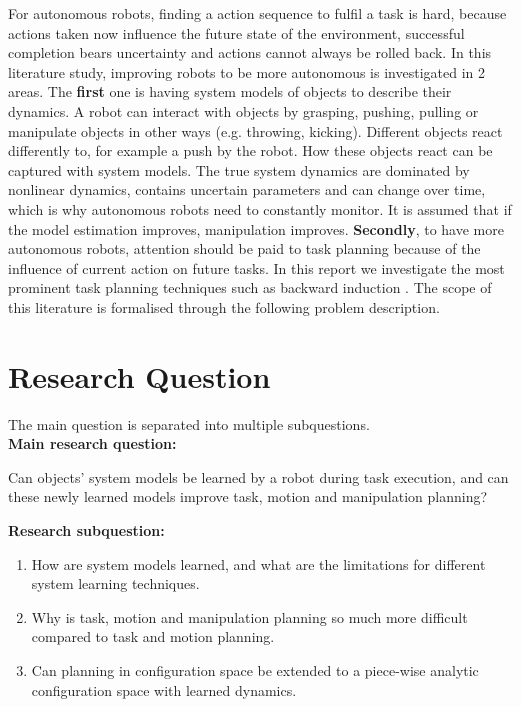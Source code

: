 For autonomous robots, finding a action sequence to fulfil a task is hard, because actions taken now influence the future state of the environment, successful completion bears uncertainty and actions cannot always be rolled back. In this literature study, improving robots to be more autonomous is investigated in 2 areas. The \textbf{first} one is having system models of objects to describe their dynamics. A robot can interact with objects by grasping, pushing, pulling or manipulate objects in other ways (e.g. throwing, kicking). Different objects react differently to, for example a push by the robot. How these objects react can be captured with system models. The true system dynamics are dominated by nonlinear dynamics, contains uncertain parameters and can change over time, which is why autonomous robots need to constantly monitor. It is assumed that if the model estimation improves, manipulation improves. \textbf{Secondly}, to have more autonomous robots, attention should be paid to task planning because of the influence of current action on future tasks. In this report we investigate the most prominent task planning techniques such as backward induction \cite{krontiris_dealing_2015}. The scope of this literature is formalised through the following problem description.\\

\section{Research Question}
\label{section: research_question}
The main question is separated into multiple subquestions.\\

\textbf{Main research question:}
\begin{center}
\large
    Can objects' system models be learned by a robot during task execution, and can these newly learned models improve task,  motion and manipulation planning?
\end{center} 

\textbf{Research subquestion:}
\begin{enumerate}
    \item \label{researchsubquestion: system_models} How are system models learned, and what are the limitations for different system learning techniques.
    \item\label{researchsubquestion: piecewise_analytic} Why is task, motion and manipulation planning so much more difficult compared to task and motion planning.
    \item \label{researchsubquestion: proposed_method} Can planning in configuration space be extended to a piece-wise analytic configuration space with learned dynamics. 
\end{enumerate}
